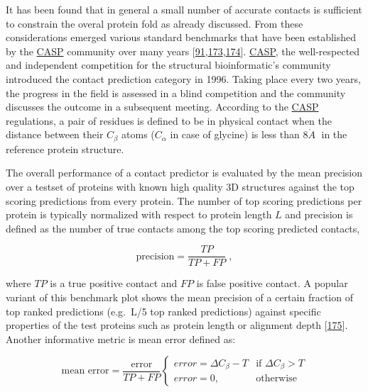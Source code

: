 \documentclass[11pt,a4paper,twoside]{book}
\newcommand{\Cb}{C_\beta}
\newcommand{\angstrom}{\mathring{A} \;}
\theoremstyle{definition}
\theoremstyle{definition}
\theoremstyle{remark}
\begin{document}
It has been found that in general a small number of accurate contacts is
sufficient to constrain the overal protein fold as already discussed.
From these considerations emerged various standard benchmarks that have
been established by the \protect\hyperlink{abbrev}{CASP} community over
many years
{[}\protect\hyperlink{ref-Monastyrskyy2015}{91},\protect\hyperlink{ref-Monastyrskyy2011}{173},\protect\hyperlink{ref-Monastyrskyy2014a}{174}{]}.
\protect\hyperlink{abbrev}{CASP}, the well-respected and independent
competition for the structural bioinformatic's community introduced the
contact prediction category in 1996. Taking place every two years, the
progress in the field is assessed in a blind competition and the
community discusses the outcome in a subsequent meeting. According to
the \protect\hyperlink{abbrev}{CASP} regulations, a pair of residues is
defined to be in physical contact when the distance between their
\(\Cb\) atoms (\(C_{\alpha}\) in case of glycine) is less than
\(8 \angstrom\) in the reference protein structure.

The overall performance of a contact predictor is evaluated by the mean
precision over a testset of proteins with known high quality 3D
structures against the top scoring predictions from every protein. The
number of top scoring predictions per protein is typically normalized
with respect to protein length \(L\) and precision is defined as the
number of true contacts among the top scoring predicted contacts,

\begin{equation}
    \textrm{precision}  = \frac{TP}{TP + FP} \; ,
\end{equation}

where \(TP\) is a true positive contact and \(FP\) is false positive
contact. A popular variant of this benchmark plot shows the mean
precision of a certain fraction of top ranked predictions (e.g.~L/5 top
ranked predictions) against specific properties of the test proteins
such as protein length or alignment depth
{[}\protect\hyperlink{ref-Ashkenazy2009}{175}{]}. Another informative
metric is mean error defined as:

\begin{equation}
    \textrm{mean error}  = \frac{\textrm{error}}{TP + FP} 
        \begin{cases}
            error = \Delta\Cb - T & \text{if } \Delta\Cb > T\\
            error = 0, &\text{otherwise }
        \end{cases}
\end{equation}
\end{document}
